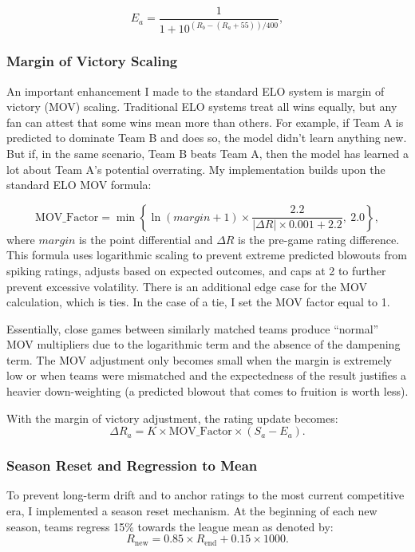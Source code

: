 \documentclass[a4paper,10.5pt,twoside]{article}
\begin{document}
\[
E_a = \frac{1}{1 + 10^{(R_b - (R_a + 55)) / 400}},
\]

\subsubsection{Margin of Victory Scaling}

An important enhancement I made to the standard ELO system is margin of victory (MOV) scaling. Traditional ELO systems treat all wins equally, but any fan can attest that some wins mean more than others. For example, if Team A is predicted to dominate Team B and does so, the model didn't learn anything new. But if, in the same scenario, Team B beats Team A, then the model has learned a lot about Team A's potential overrating. My implementation builds upon the standard ELO MOV formula:

\[
\text{MOV\_Factor} = \min\left\{\ln(margin + 1) \times \frac{2.2}{|\Delta R| \times 0.001 + 2.2},\ 2.0\right\},
\]
where $margin$ is the point differential and $\Delta R$ is the pre-game rating difference. This formula uses logarithmic scaling to prevent extreme predicted blowouts from spiking ratings, adjusts based on expected outcomes, and caps at 2 to further prevent excessive volatility. There is an additional edge case for the MOV calculation, which is ties. In the case of a tie, I set the MOV factor equal to 1. 

Essentially, close games between similarly matched teams produce “normal” MOV multipliers due to the logarithmic term and the absence of the dampening term. The MOV adjustment only becomes small when the margin is extremely low or when teams were mismatched and the expectedness of the result justifies a heavier down-weighting (a predicted blowout that comes to fruition is worth less).

With the margin of victory adjustment, the rating update becomes:
\[
\Delta R_a = K \times \text{MOV\_Factor} \times (S_a - E_a).
\]

\subsubsection{Season Reset and Regression to Mean}

To prevent long-term drift and to anchor ratings to the most current competitive era, I implemented a season reset mechanism. At the beginning of each new season, teams regress 15\% towards the league mean as denoted by:
\[
R_{\text{new}} = 0.85 \times R_{\text{end}} + 0.15 \times 1000.
\]
\end{document}
